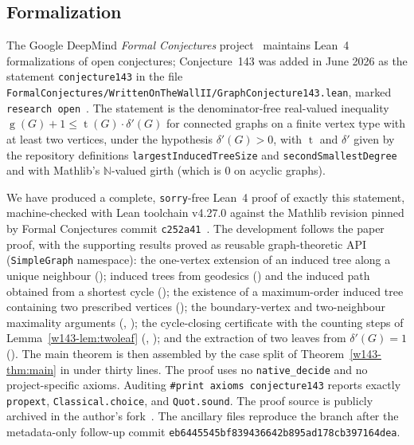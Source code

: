 \documentclass[11pt]{article}
\numberwithin{equation}{section}
\theoremstyle{remark}
\newcommand{\tr}{\operatorname{t}}
\newcommand{\gr}{\operatorname{g}}
\newcommand{\dd}{\delta'}
\begin{document}
\subsection{Formalization}\label{w143-sec:formal}

The Google DeepMind \emph{Formal Conjectures} project~\cite{FC,FCPaper} maintains
Lean~4 formalizations of open conjectures; Conjecture~143 was added in June
2026 as the statement \texttt{conjecture143} in the file
\texttt{FormalConjectures/WrittenOnTheWallII/GraphConjecture143.lean},
marked \texttt{research open}~\cite{FC143}.  The statement is the
denominator-free real-valued inequality
$\gr(G)+1\le\tr(G)\cdot\dd(G)$ for connected graphs on a finite
vertex type with at least two vertices, under the hypothesis $\dd(G)>0$, with
$\tr$ and $\dd$ given by the repository definitions
\texttt{largestInducedTreeSize} and \texttt{secondSmallestDegree} and with
Mathlib's $\mathbb{N}$-valued girth (which is $0$ on acyclic graphs).

\begin{sloppypar}
We have produced a complete, \texttt{sorry}-free Lean~4 proof of exactly this
statement, machine-checked with Lean toolchain v4.27.0 against the Mathlib
revision pinned by Formal Conjectures commit \texttt{c252a41}~\cite{mathlib}.
The development follows the paper proof, with the
supporting results proved as reusable graph-theoretic API
(\texttt{SimpleGraph} namespace): the one-vertex extension of an induced tree
along a unique neighbour ();
induced trees from geodesics
() and the induced
path obtained from a shortest cycle
(); the existence of a
maximum-order induced tree containing two prescribed vertices
(); the boundary-vertex and
two-neighbour maximality arguments
(,
); the
cycle-closing certificate with the counting steps of Lemma~\ref{w143-lem:twoleaf}
(,
); and the
extraction of two leaves from $\dd(G)=1$
().
The main theorem is then assembled by the case split of
Theorem~\ref{w143-thm:main} in under thirty lines.  The proof uses no
\texttt{native\_decide} and no project-specific axioms.  Auditing
\texttt{\#print axioms conjecture143} reports exactly \texttt{propext},
\texttt{Classical.choice}, and \texttt{Quot.sound}.  The proof source is
publicly archived in the author's fork~\cite{OurLean}.  The ancillary files
reproduce the branch after the metadata-only follow-up commit
\texttt{eb6445545bf839436642b895ad178cb397164dea}.
\end{sloppypar}
\end{document}
